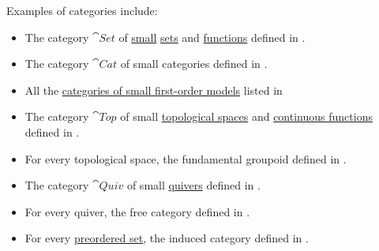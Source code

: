 \begin{example}\label{ex:def:category}
  Examples of categories include:

  \begin{itemize}
    \item The category \( \cat{Set} \) of \hyperref[def:large_and_small_sets]{small} \hyperref[def:set]{sets} and \hyperref[def:function]{functions} defined in .

    \item The category \( \cat{Cat} \) of small categories defined in .

    \item All the \hyperref[def:category_of_small_first_order_models]{categories of small first-order models} listed in 

    \item The category \( \cat{Top} \) of small \hyperref[def:topological_space]{topological spaces} and \hyperref[def:global_continuity]{continuous functions} defined in .

    \item For every topological space, the fundamental groupoid defined in .

    \item The category \( \cat{Quiv} \) of small \hyperref[def:quiver]{quivers} defined in .

    \item For every quiver, the free category defined in .

    \item For every \hyperref[def:preordered_set]{preordered set}, the induced category defined in .
  \end{itemize}
\end{example}

